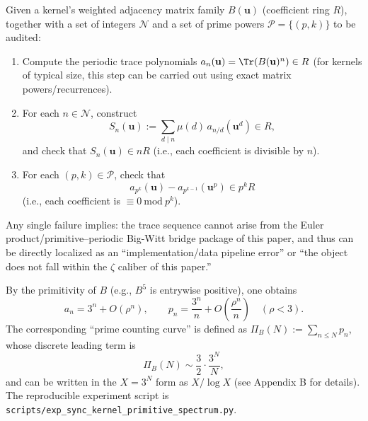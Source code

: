 \begin{algorithm}\label{alg:self-audit-witt}
Given a kernel's weighted adjacency matrix family \(B(\mathbf u)\) (coefficient ring \(R\)), together with a set of integers \(\mathcal N\) and a set of prime powers \(\mathcal P=\{(p,k)\}\) to be audited:
\begin{enumerate}
  \item Compute the periodic trace polynomials \(a_n(\mathbf u)=\Tr(B(\mathbf u)^n)\in R\) (for kernels of typical size, this step can be carried out using exact matrix powers/recurrences).
  \item For each \(n\in\mathcal N\), construct
  \[
  S_n(\mathbf u):=\sum_{d\mid n}\mu(d)\,a_{n/d}(\mathbf u^d)\in R,
  \]
  and check that \(S_n(\mathbf u)\in nR\) (i.e., each coefficient is divisible by \(n\)).
  \item For each \((p,k)\in\mathcal P\), check that
  \[
  a_{p^k}(\mathbf u)-a_{p^{k-1}}(\mathbf u^p)\in p^kR
  \]
  (i.e., each coefficient is \(\equiv 0\ \mathrm{mod}\ p^k\)).
\end{enumerate}
Any single failure implies: the trace sequence cannot arise from the Euler product/primitive--periodic Big-Witt bridge package of this paper, and thus can be directly localized as an ``implementation/data pipeline error'' or ``the object does not fall within the \(\zeta\) caliber of this paper.''
\end{algorithm}

By the primitivity of $B$ (e.g., $B^5$ is entrywise positive), one obtains
\[
a_n=3^n+O(\rho^n),\qquad
p_n=\frac{3^n}{n}+O\!\left(\frac{\rho^n}{n}\right)\quad(\rho<3).
\]
The corresponding ``prime counting curve'' is defined as $\Pi_B(N):=\sum_{n\le N}p_n$, whose discrete leading term is
\[
\Pi_B(N)\sim \frac{3}{2}\cdot \frac{3^N}{N},
\]
and can be written in the $X=3^N$ form as $X/\log X$ (see Appendix B for details). The reproducible experiment script is \texttt{scripts/exp\_sync\_kernel\_primitive\_spectrum.py}.


